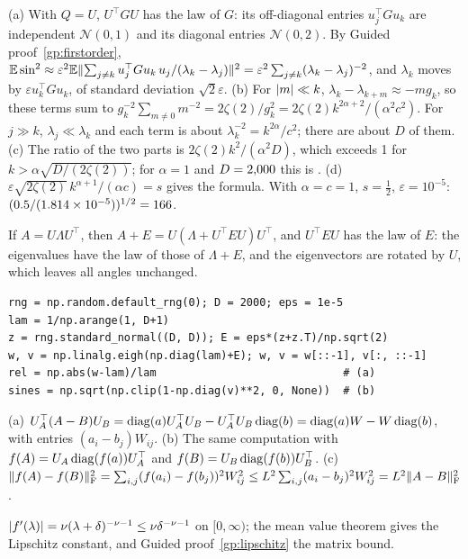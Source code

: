 (a) With $Q=U$, $U^\top GU$ has the law of $G$: its off-diagonal entries $u_j^\top Gu_k$ are independent
$\mathcal{N}(0,1)$ and its diagonal entries $\mathcal{N}(0,2)$. By Guided proof~\ref{gp:firstorder},
$\mathbb{E}\sin^2\approx\varepsilon^2\mathbb{E}\lVert\sum_{j\ne k}u_j^\top Gu_k\,u_j/(\lambda_k-\lambda_j)\rVert^2=\varepsilon^2\sum_{j\ne k}(\lambda_k-\lambda_j)^{-2}$,
and $\lambda_k$ moves by $\varepsilon u_k^\top Gu_k$, of standard deviation $\sqrt2\varepsilon$.
\newline (b) For $\lvert m\rvert\ll k$, $\lambda_k-\lambda_{k+m}\approx-mg_k$, so these terms sum to
$g_k^{-2}\sum_{m\ne0}m^{-2}=2\zeta(2)/g_k^2=2\zeta(2)k^{2\alpha+2}/(\alpha^2c^2)$. For $j\gg k$, $\lambda_j\ll\lambda_k$
and each term is about $\lambda_k^{-2}=k^{2\alpha}/c^2$; there are about $D$ of them.
\newline (c) The ratio of the two parts is $2\zeta(2)k^2/(\alpha^2D)$, which exceeds 1 for $k>\alpha\sqrt{D/(2\zeta(2))}$;
for $\alpha=1$ and $D=2{,}000$ this is \NumNeighbourRank.
\newline (d) $\varepsilon\sqrt{2\zeta(2)}\,k^{\alpha+1}/(\alpha c)=s$ gives the formula. With $\alpha=c=1$, $s=\frac12$,
$\varepsilon=10^{-5}$: $(0.5/(1.814\times10^{-5}))^{1/2}=166$.

If $A=U\Lambda U^\top$, then $A+E=U(\Lambda+U^\top EU)U^\top$, and $U^\top EU$ has the law of $E$: the eigenvalues have
the law of those of $\Lambda+E$, and the eigenvectors are rotated by $U$, which leaves all angles unchanged.
\begin{verbatim}
rng = np.random.default_rng(0); D = 2000; eps = 1e-5
lam = 1/np.arange(1, D+1)
z = rng.standard_normal((D, D)); E = eps*(z+z.T)/np.sqrt(2)
w, v = np.linalg.eigh(np.diag(lam)+E); w, v = w[::-1], v[:, ::-1]
rel = np.abs(w-lam)/lam                             # (a)
sines = np.sqrt(np.clip(1-np.diag(v)**2, 0, None))  # (b)
\end{verbatim}

(a) $U_A^\top(A-B)U_B=\operatorname{diag}(a)U_A^\top U_B-U_A^\top U_B\operatorname{diag}(b)=\operatorname{diag}(a)W-W\operatorname{diag}(b)$, with entries $(a_i-b_j)W_{ij}$.
\newline (b) The same computation with $f(A)=U_A\operatorname{diag}(f(a))U_A^\top$ and $f(B)=U_B\operatorname{diag}(f(b))U_B^\top$.
\newline (c) $\lVert f(A)-f(B)\rVert_{\mathrm{F}}^2=\sum_{i,j}(f(a_i)-f(b_j))^2W_{ij}^2\le L^2\sum_{i,j}(a_i-b_j)^2W_{ij}^2=L^2\lVert A-B\rVert_{\mathrm{F}}^2$.

$\lvert f'(\lambda)\rvert=\nu(\lambda+\delta)^{-\nu-1}\le\nu\delta^{-\nu-1}$ on $[0,\infty)$; the mean value theorem gives the
Lipschitz constant, and Guided proof~\ref{gp:lipschitz} the matrix bound.

